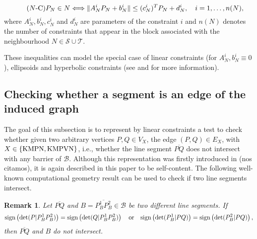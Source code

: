 \documentclass[a4paper,  review, authoryear, 1p.]{elsarticle}
\newtheorem{remark}{Remark}
\newcommand{\determinant}[3]{\det({#1|#2#3})}
\begin{document}
		\begin{equation*}\tag{$N$-C}\label{eq:nC}
			P_N\in N \Longleftrightarrow
			\|A_N^i P_N + b_N^i\| \leq (c_N^i)^T P_N + d_N^i,\quad i=1,\ldots,n(N), \\
		\end{equation*}
		where $A_N^i, b_N^i, c_N^i$ and $d_N^i$ are parameters of the constraint $i$ and $n(N)$ denotes the number of constraints that appear in the block associated with the neighbourhood $N\in \mathcal S\cup \mathcal T$. 
		
		These inequalities can model the special case of linear constraints (for $A_N^{i}, b_N^i\equiv 0$), ellipsoids and hyperbolic constraints (see \citet{lobo_applications_1998} and \citet{boyd_convex_2004} for more information).
		
		\subsection{Checking whether a segment is an edge of the induced graph}
		
		The goal of this subsection is to represent by linear constraints a test to check whether given two arbitrary vertices $P, Q\in V_X$, the edge $(P, Q)\in E_X$, with $X\in\{\rm KMPN, \rm KMPVN\}$, i.e., whether the line segment $\overline{PQ}$ does not intersect with any barrier of $\mathcal B$. Although this representation was firstly introduced in (nos citamos), it is again described in this paper to be self-content. The following well-known computational geometry result can be used to check if two line segments intersect.
		
		\begin{remark}\label{rem:determinants}
	Let $\overline{PQ}$ and $B=\overline{P_B^1P_B^2}\in\mathcal B$ be two different line segments. 
	If
	\begin{equation*}
		\normalfont{\text{sign}}\left(\determinant{P}{P_B^1}{P_B^2}\right) = \normalfont{\text{sign}}\left(\determinant{Q}{P_B^1}{P_B^2}\right)
		\quad
		\text{or}
		\quad
		\normalfont{\text{sign}}\left(\determinant{P_B^1}{P}{Q}\right) = \normalfont{\text{sign}}\left(\determinant{P_B^2}{P}{Q}\right)
		,
	\end{equation*}
	then $\overline{PQ}$ and $B$ do not intersect.
\end{remark}
\end{document}
